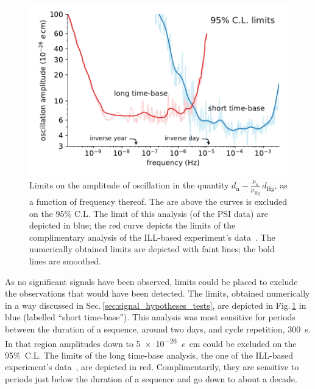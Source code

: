
\begin{figure}
  \centering
  \includegraphics[width=0.8\linewidth]{gfx/axions/psi_ill_1e-26ecm.pdf}
  \caption{Limits on the amplitude of oscillation in the quantity $d_\text{n} - \frac{\mu_\text{n}}{\mu_\text{Hg}} \, d_\text{Hg}$, as a function of frequency thereof. The are above the curves is excluded on the 95\% C.L. The limit of this analysis (of the PSI data) are depicted in blue; the red curve depicts the limits of the complimentary analysis of the ILL-based experiment's data~\cite{AyresThesis,PhysRevX.7.041034}. The numerically obtained limits are depicted with faint lines; the bold lines are smoothed.}
\label{fig:axions_limits_nEDM}
\end{figure}

As no significant signals have been observed, limits could be placed to exclude the observations that would have been detected. The limits, obtained numerically in a way discussed in Sec.\,\ref{sec:signal_hypotheses_tests}, are depicted in Fig.\,\ref{fig:axions_limits_nEDM} in blue (labelled ``short time-base''). This analysis was most sensitive for periods between the duration of a sequence, around two days, and cycle repetition, \SI{300}{\second}. In that region amplitudes down to \SI{5e-26}{\elementarycharge\centi\meter} could be excluded on the 95\%~C.L. The limits of the long time-base analysis, the one of the ILL-based experiment's data~\cite{AyresThesis,PhysRevX.7.041034}, are depicted in red. Complimentarily, they are sensitive to periods just below the duration of a sequence and go down to about a decade.

